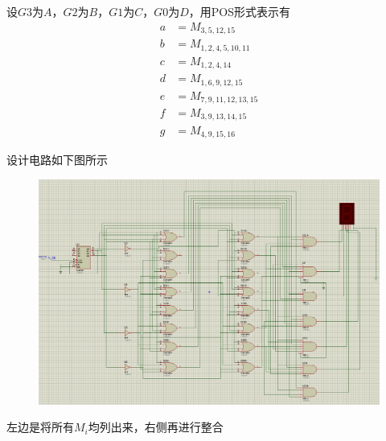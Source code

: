 \documentclass[11pt,UTF8]{ctexart}
\begin{document}
\par 设$G3$为$A$，$G2$为$B$，$G1$为$C$，$G0$为$D$，用POS形式表示有
\[\begin{aligned}
a&=M_{3,5,12,15}\\
b&=M_{1,2,4,5,10,11}\\
c&=M_{1,2,4,14}\\
d&=M_{1,6,9,12,15}\\
e&=M_{7,9,11,12,13,15}\\
f&=M_{3,9,13,14,15}\\
g&=M_{4,9,15,16}
\end{aligned}\]
\par 设计电路如下图所示
\begin{figure}[H]
\centering
\includegraphics[width=\linewidth]{fig/lab3_plus.PNG}
\label{Fig:plus}
\end{figure}
\par 左边是将所有$M_i$均列出来，右侧再进行整合
\end{document}
